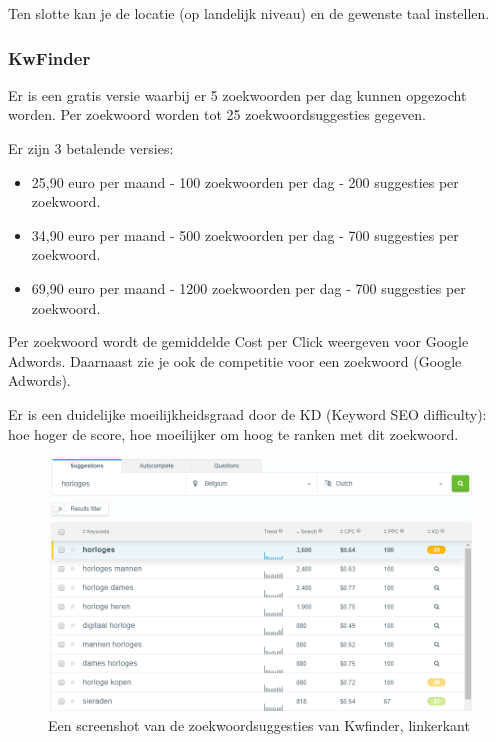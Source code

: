 Ten slotte kan je de locatie (op landelijk niveau) en de gewenste taal instellen.

\subsubsection{KwFinder}
\label{ch: KwFinder}

Er is een gratis versie waarbij er 5 zoekwoorden per dag kunnen opgezocht worden. Per zoekwoord worden tot 25 zoekwoordsuggesties gegeven. 

Er zijn 3 betalende versies: 

\begin{itemize}
\item 25,90 euro per maand - 100 zoekwoorden per dag - 200 suggesties per zoekwoord.
\item 34,90 euro per maand - 500 zoekwoorden per dag - 700 suggesties per zoekwoord.
\item 69,90 euro per maand - 1200 zoekwoorden per dag - 700 suggesties per zoekwoord.
\end{itemize}

Per zoekwoord wordt de gemiddelde Cost per Click weergeven voor Google Adwords. Daarnaast zie je ook de competitie voor een zoekwoord (Google Adwords). 

Er is een duidelijke moeilijkheidsgraad door de KD (Keyword SEO difficulty): hoe hoger de score, hoe moeilijker om hoog te ranken met dit zoekwoord. 

\begin{figure}[h!]
\centering
\includegraphics[width=\linewidth]{img/kwfinderlinks.PNG}
\caption{Een screenshot van de zoekwoordsuggesties van Kwfinder, linkerkant \autocite{kwfinder}}
\end{figure}

